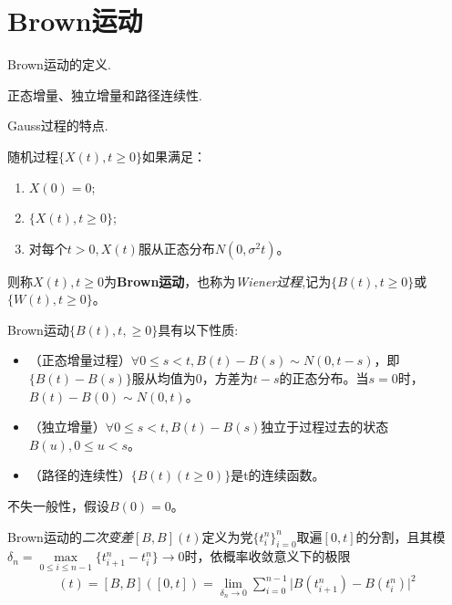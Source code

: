 
\chapter{Brown运动}

\begin{compactitem}
	\item Brown运动的定义.
	\item 正态增量、独立增量和路径连续性.
	\item Gauss过程的特点.
\end{compactitem}

\begin{definition}\label{def:BrownMotion}
	随机过程\(\{X(t),t \geqslant 0 \}\)如果满足：
	\begin{enumerate}[\bfseries (1)]
		\item \(X(0)=0\);
		\item \(\{X(t),t\geqslant 0\}\);
		\item 对每个\(t>0,X(t)\)服从正态分布\(N(0,\sigma^2t)\)。
	\end{enumerate}
	则称\(X(t),t \geqslant 0\)为\textbf{Brown运动}，也称为\emph{Wiener过程},记为\(\{B(t),t\geqslant0\}\)或\(\{W(t),t\geqslant0\}\)。
\end{definition}

Brown运动\(\{B(t),t,\geqslant 0\}\)具有以下性质:
\begin{itemize}[\bfseries (1)]
	\item （正态增量过程）\(\forall 0\leqslant s <t,B(t)-B(s)\sim N(0,t-s)\)，即\(\{B(t)-B(s)\}\)服从均值为0，方差为\(t-s\)的正态分布。当\(s=0\)时，\(B(t)-B(0)\sim N(0,t)\)。
	\item （独立增量）\(\forall 0\leqslant s <t,B(t)-B(s)\)独立于过程过去的状态\(B(u),0\leqslant u<s\)。
	\item （路径的连续性）\(\{B(t)(t\geqslant0)\}\)是t的连续函数。
\end{itemize}

不失一般性，假设\(B(0)=0\)。

\begin{definition}\label{def:QuadraticVariation}
	Brown运动的\emph{二次变差}\([B,B](t)\)定义为党\(\{t_i^n\}_{i=0}^n\)取遍\([0,t]\)的分割，且其模
	\(\delta_n=\underset{0\leqslant i\leqslant n-1}{\max}\{t_{i+1}^{n}-t_{i}^n\}\to 0\)时，依概率收敛意义下的极限
	\begin{align*}
		[B,B](t)=[B,B]([0,t])=\underset{\delta_n \to 0}{\lim}\sum_{i=0}^{n-1}
		\lvert B(t_{i+1}^n)-B(t_i^n) \rvert^2
	\end{align*}
\end{definition}

